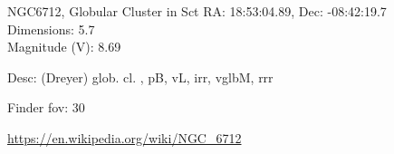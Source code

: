 \begin{block}{NGC6712, Globular Cluster in Sct}
    RA: 18:53:04.89, Dec: -08:42:19.7 \\ 
    Dimensions: 5.7 \\ 
    Magnitude (V): 8.69


    Desc: (Dreyer) glob. cl. , pB, vL, irr, vglbM, rrr 

    Finder fov: 30 

    \url{https://en.wikipedia.org/wiki/NGC_6712} 
\end{block}